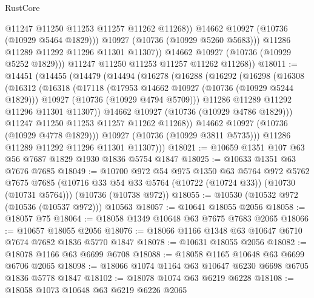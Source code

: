 \begin{lexlean}{RustCore}
\begin{coremodule}
                      @11247
                      @11250
                      @11253
                      @11257
                      @11262
                      @11268))
                  @14662
                  @10927
                  (@10736 (@10929 @5464 @1829)))
                @10927
                (@10736 (@10929 @5260 @5683)))
              @11286
              @11289
              @11292
              @11296
              @11301
              @11307))
          @14662
          @10927
          (@10736 (@10929 @5252 @1829)))
        @11247
        @11250
        @11253
        @11257
        @11262
        @11268))
@18011 := @14451
    (@14455
      (@14479
        (@14494
          (@16278
            (@16288
              (@16292
                (@16298
                  (@16308
                    (@16312
                      (@16318
                        (@17118
                          (@17953 @14662 @10927 (@10736 (@10929 @5244 @1829)))
                          @10927
                          (@10736 (@10929 @4794 @5709)))
                        @11286
                        @11289
                        @11292
                        @11296
                        @11301
                        @11307))
                    @14662
                    @10927
                    (@10736 (@10929 @4786 @1829)))
                  @11247
                  @11250
                  @11253
                  @11257
                  @11262
                  @11268))
              @14662
              @10927
              (@10736 (@10929 @4778 @1829)))
            @10927
            (@10736 (@10929 @3811 @5735)))
          @11286
          @11289
          @11292
          @11296
          @11301
          @11307)))
@18021 := @10659 @1351 @107 @63 @56 @7687 @1829 @1930 @1836 @5754 @1847
@18025 := @10633 @1351 @63 @7676 @7685
@18049 := @10700
    @972
    @54
    @975
    @1350
    @63
    @5764
    @972
    @5762
    @7675
    @7685
    (@10716 @33 @54 @33 @5764 (@10722 (@10724 @33)) (@10730 (@10731 @5764)))
    (@10736 (@10738 @972))
@18055 := @10530 (@10532 @972 (@10536 (@10537 @972))) @10563
@18057 := @10641 @18055 @2056
@18058 := @18057 @75
@18064 := @18058 @1349 @10648 @63 @7675 @7683 @2065
@18066 := @10657 @18055 @2056
@18076 := @18066 @1166 @1348 @63 @10647 @6710 @7674 @7682 @1836 @5770 @1847
@18078 := @10631 @18055 @2056
@18082 := @18078 @1166 @63 @6699 @6708
@18088 := @18058 @1165 @10648 @63 @6699 @6706 @2065
@18098 := @18066 @1074 @1164 @63 @10647 @6230 @6698 @6705 @1836 @5778 @1847
@18102 := @18078 @1074 @63 @6219 @6228
@18108 := @18058 @1073 @10648 @63 @6219 @6226 @2065

\end{coremodule}
\end{lexlean}
